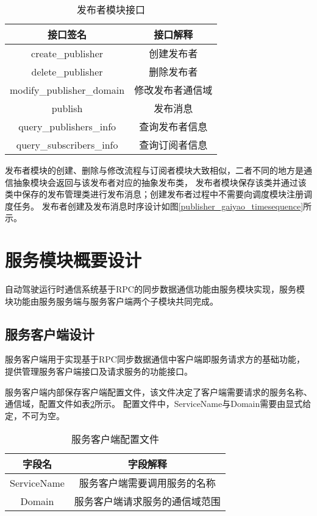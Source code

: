\begin{table}[htb]
  \centering\small
  \renewcommand\arraystretch{1.2}
  \caption{发布者模块接口}
  \label{publisher_interface}
  \begin{tabular}{cc}
    \toprule
    接口签名 & 接口解释 \\
    \midrule
    create\_publisher & 创建发布者\\
    delete\_publisher & 删除发布者\\
    modify\_publisher\_domain & 修改发布者通信域\\
    publish & 发布消息 \\
    query\_publishers\_info & 查询发布者信息\\
    query\_subscribers\_info & 查询订阅者信息\\
    \bottomrule
  \end{tabular}
\end{table}

发布者模块的创建、删除与修改流程与订阅者模块大致相似，二者不同的地方是通信抽象模块会返回与该发布者对应的抽象发布类，
发布者模块保存该类并通过该类中保存的发布管理类进行发布消息；创建发布者过程中不需要向调度模块注册调度任务。
发布者创建及发布消息时序设计如图\ref{publisher_gaiyao_timesequence}所示。


\section{服务模块概要设计}
自动驾驶运行时通信系统基于RPC的同步数据通信功能由服务模块实现，服务模块功能由服务服务端与服务客户端两个子模块共同完成。

\subsection{服务客户端设计}
服务客户端用于实现基于RPC同步数据通信中客户端即服务请求方的基础功能，提供管理服务客户端接口及请求服务的功能接口。

服务客户端内部保存客户端配置文件，该文件决定了客户端需要请求的服务名称、通信域，配置文件如表\ref{service_client_config_file}所示。
配置文件中，ServiceName与Domain需要由显式给定，不可为空。
\begin{table}[H]
  \centering\small
  \caption{服务客户端配置文件}
  \label{service_client_config_file}
  \renewcommand\arraystretch{1.2}
  \begin{tabular}{cc}
    \toprule
    字段名 & 字段解释 \\
    \midrule
    ServiceName & 服务客户端需要调用服务的名称\\
    Domain & 服务客户端请求服务的通信域范围\\
    \bottomrule
  \end{tabular}
\end{table}

